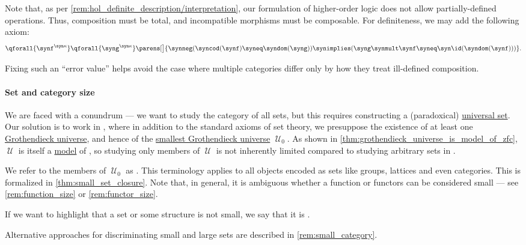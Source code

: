 \begin{remark}
  Note that, as per \cref{rem:hol_definite_description/interpretation}, our formulation of higher-order logic does not allow partially-defined operations. Thus, composition must be total, and incompatible morphisms must be composable. For definiteness, we may add the following axiom:
  \begin{equation*}
    \qforall {\synf^{\syn\kappa}} \qforall {\syng^{\syn\kappa}} \parens[\big]{ \synneg (\syncod(\synf) \syneq \syndom(\syng)) \synimplies (\syng \synmult \synf \syneq \syn\id(\syndom(\synf))) }.
  \end{equation*}

  Fixing such an \enquote{error value} helps avoid the case where multiple categories differ only by how they treat ill-defined composition.
\end{remark}

\paragraph{Set and category size}

\begin{definition}\label{def:small_set}
  We are faced with a conundrum --- we want to study the category of all sets, but this requires constructing a (paradoxical) \hyperref[def:universal_set]{universal set}. Our solution is to work in \hyperref[def:axiom_of_universes]{}, where in addition to the standard axioms of set theory, we presuppose the existence of at least one \hyperref[def:grothendieck_universe]{Grothendieck universe}, and hence of the \hyperref[def:smallest_grothendieck_universe]{smallest Grothendieck universe} \( \mscrU_0 \). As shown in \cref{thm:grothendieck_universe_is_model_of_zfc}, \( \mscrU \) is itself a \hyperref[def:fol_semantics/model]{model} of \hyperref[def:zfc]{}, so studying only members of \( \mscrU \) is not inherently limited compared to studying arbitrary sets in .

  We refer to the members of \( \mscrU_0 \) as . This terminology applies to all objects encoded as sets like groups, lattices and even categories. This is formalized in \cref{thm:small_set_closure}. Note that, in general, it is ambiguous whether a function or functors can be considered small --- see \cref{rem:function_size} or \cref{rem:functor_size}.

  If we want to highlight that a set or some structure is not small, we say that it is .
\end{definition}
\begin{comments}
  \item Alternative approaches for discriminating small and large sets are described in \cref{rem:small_category}.
\end{comments}

